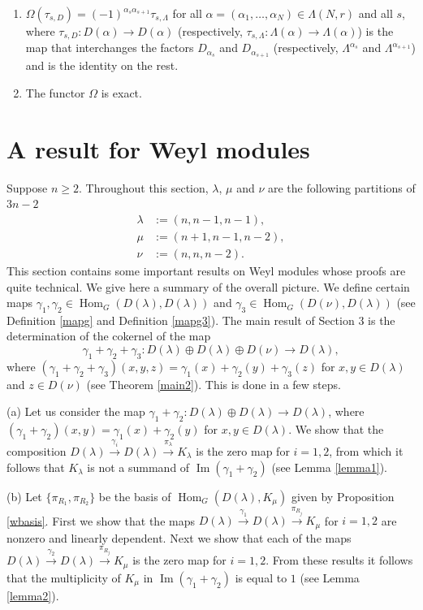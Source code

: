 \documentclass[11pt]{amsart}
\theoremstyle{definition}
\numberwithin{equation}{section}
\DeclareMathOperator{\Ima}{Im}
\DeclareMathOperator{\Hom}{Hom}
\begin{document}
\begin{enumerate}
\item $\Omega(\tau_{s,D}) = (-1)^{\alpha_s \alpha_{s+1}}\tau_{s,\Lambda}$ for all $\alpha =(\alpha_1, \dots, \alpha_N) \in \Lambda(N,r)$ and all $s$, where $\tau_{s,D}: D(\alpha) \to D(\alpha)$ (respectively, $\tau_{s,\Lambda}: \Lambda(\alpha) \to \Lambda(\alpha)$) is the map that interchanges the factors $D_{\alpha_s}$ and $D_{\alpha_{s+1}}$ (respectively, $\Lambda^{\alpha_s}$ and $\Lambda^{\alpha_{s+1}}$) and is the identity on the rest.\item The functor $\Omega$ is exact.\end{enumerate}





\section{A result for Weyl modules}\label{sec3}
Suppose $n \ge 2$. Throughout this section,  $\lambda$, $\mu$ and $\nu$ are the following partitions of $3n-2$
\begin{align*}\lambda&:=(n,n-1,n-1), \\ \mu&:=(n+1,n-1,n-2), \\ \nu&:=(n,n,n-2).\end{align*}
This section contains some important results on Weyl modules whose proofs  are quite technical. We give here a summary of the overall picture. We define certain maps $\gamma_1, \gamma_2  \in \Hom _G(D(\lambda), D(\lambda))$ and $\gamma_3  \in \Hom _G(D(\nu), D(\lambda))$ (see Definition \ref{mapg} and Definition \ref{mapg3}). The main result of Section 3 is the determination of the cokernel of the map \[\gamma_1 + \gamma_2 + \gamma_3 : D(\lambda) \oplus D(\lambda) \oplus D(\nu) \to D(\lambda),\] where $(\gamma_1+\gamma_2+\gamma_3)(x,y,z)=\gamma_1(x)+\gamma_2(y)+\gamma_3(z)$ for $x,y \in D(\lambda)$ and $z \in D(\nu)$ (see Theorem \ref{main2}). This is done in a few steps.

(a) Let us consider the map $\gamma_1+\gamma_2 : D(\lambda) \oplus D(\lambda) \to D(\lambda)$, where $(\gamma_1+\gamma_2)(x,y)=\gamma_1(x)+\gamma_2(y)$ for $x,y \in D(\lambda)$. We show that the composition $D(\lambda) \xrightarrow{\gamma_i} D(\lambda) \xrightarrow{\pi_\lambda} K_\lambda$ is the zero map for $i=1,2$, from which it follows that $K_\lambda$ is not a summand of  $\Ima(\gamma_1+\gamma_2)$ (see Lemma \ref{lemma1}).

(b) Let $\{\pi_{R_1}, \pi_{R_2}\}$ be the basis of $\Hom_G(D(\lambda), K_\mu)$ given by Proposition \ref{wbasis}. First we show that the maps 
$D(\lambda) \xrightarrow{\gamma_1} D(\lambda) \xrightarrow{\pi_{R_j}} K_\mu$ for $i=1,2$ are nonzero and linearly dependent. Next we show that each of the maps $D(\lambda) \xrightarrow{\gamma_2} D(\lambda) \xrightarrow{\pi_{R_j}} K_\mu$ is the zero map for $i=1,2$. From these results it follows that the multiplicity of $K_\mu$ in $\Ima(\gamma_1+\gamma_2)$ is equal to $1$ (see Lemma \ref{lemma2}).
\end{document}
